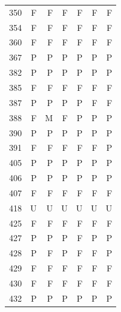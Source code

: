\begin{table}[!htbp]
\begin{tabular*}{\textwidth}{@{\extracolsep{\fill}}rrrrrrr}
350 & F & F & F & F & F & F\\
354 & F & F & F & F & F & F\\
360 & F & F & F & F & F & F\\
367 & P & P & P & P & P & P\\
382 & P & P & P & P & P & P\\
385 & F & F & F & F & F & F\\
387 & P & P & P & P & F & F\\
388 & F & M & F & P & P & P\\
390 & P & P & P & P & P & P\\
391 & F & F & F & F & F & P\\
405 & P & P & P & P & P & P\\
406 & P & P & P & P & P & P\\
407 & F & F & F & F & F & F\\
418 & U & U & U & U & U & U\\
425 & F & F & F & F & F & F\\
427 & P & P & P & F & P & P\\
428 & P & F & P & F & F & P\\
429 & F & F & F & F & F & F\\
430 & F & F & F & F & F & F\\
432 & P & P & P & P & P & P\\
\bottomrule\end{tabular*}\end{table}
\clearpage
